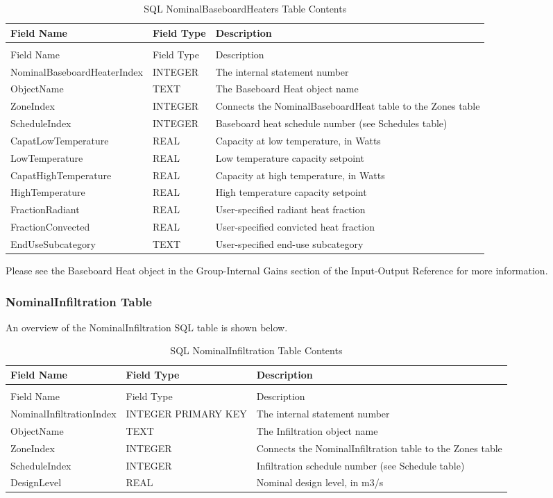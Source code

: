 \begin{longtable}[c]{p{1.5in}p{1.5in}p{2.99in}}
\caption{SQL NominalBaseboardHeaters Table Contents \label{table:table-22.-sql-nominalbaseboardheaters-table}} \tabularnewline
\toprule 
Field Name & Field Type & Description \tabularnewline
\midrule
\endfirsthead

\caption[]{SQL NominalBaseboardHeaters Table Contents} \tabularnewline
\toprule 
Field Name & Field Type & Description \tabularnewline
\midrule
\endhead

NominalBaseboardHeaterIndex & INTEGER & The internal statement number \tabularnewline
ObjectName & TEXT & The Baseboard Heat object name \tabularnewline
ZoneIndex & INTEGER & Connects the NominalBaseboardHeat table to the Zones table \tabularnewline
ScheduleIndex & INTEGER & Baseboard heat schedule number (see Schedules table) \tabularnewline
CapatLowTemperature & REAL & Capacity at low temperature, in Watts \tabularnewline
LowTemperature & REAL & Low temperature capacity setpoint \tabularnewline
CapatHighTemperature & REAL & Capacity at high temperature, in Watts \tabularnewline
HighTemperature & REAL & High temperature capacity setpoint \tabularnewline
FractionRadiant & REAL & User-specified radiant heat fraction \tabularnewline
FractionConvected & REAL & User-specified convicted heat fraction \tabularnewline
EndUseSubcategory & TEXT & User-specified end-use subcategory \tabularnewline
\bottomrule
\end{longtable}

Please see the Baseboard Heat object in the Group-Internal Gains section of the Input-Output Reference for more information.

\subsubsection{NominalInfiltration Table}

An overview of the NominalInfiltration SQL table is shown below.

\begin{longtable}[c]{p{1.5in}p{1.5in}p{3.0in}}
\caption{SQL NominalInfiltration Table Contents \label{table:table-23.-sql-nominalinfiltration-table}} \tabularnewline
\toprule 
Field Name & Field Type & Description \tabularnewline
\midrule
\endfirsthead

\caption[]{SQL NominalInfiltration Table Contents} \tabularnewline
\toprule 
Field Name & Field Type & Description \tabularnewline
\midrule
\endhead

NominalInfiltrationIndex & INTEGER PRIMARY KEY & The internal statement number \tabularnewline
ObjectName & TEXT & The Infiltration object name \tabularnewline
ZoneIndex & INTEGER & Connects the NominalInfiltration table to the Zones table \tabularnewline
ScheduleIndex & INTEGER & Infiltration schedule number (see Schedule table) \tabularnewline
DesignLevel & REAL & Nominal design level, in m3/s \tabularnewline
\bottomrule
\end{longtable}

